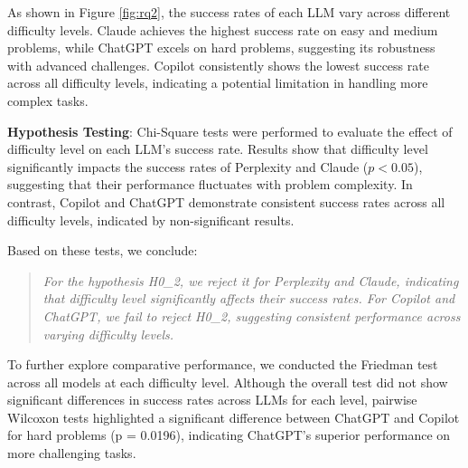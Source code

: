 \documentclass[conference]{IEEEtran}
\begin{document}
As shown in Figure \ref{fig:rq2}, the success rates of each LLM vary across different difficulty levels. Claude achieves the highest success rate on easy and medium problems, while ChatGPT excels on hard problems, suggesting its robustness with advanced challenges. Copilot consistently shows the lowest success rate across all difficulty levels, indicating a potential limitation in handling more complex tasks.

\textbf{Hypothesis Testing}: Chi-Square tests were performed to evaluate the effect of difficulty level on each LLM's success rate. Results show that difficulty level significantly impacts the success rates of Perplexity and Claude (\( p < 0.05 \)), suggesting that their performance fluctuates with problem complexity. In contrast, Copilot and ChatGPT demonstrate consistent success rates across all difficulty levels, indicated by non-significant results.

Based on these tests, we conclude:
\begin{quote}
\textit{For the hypothesis H0\_2, we reject it for Perplexity and Claude, indicating that difficulty level significantly affects their success rates. For Copilot and ChatGPT, we fail to reject H0\_2, suggesting consistent performance across varying difficulty levels.}
\end{quote}

To further explore comparative performance, we conducted the Friedman test across all models at each difficulty level. Although the overall test did not show significant differences in success rates across LLMs for each level, pairwise Wilcoxon tests highlighted a significant difference between ChatGPT and Copilot for hard problems (p = 0.0196), indicating ChatGPT's superior performance on more challenging tasks.

\end{document}
